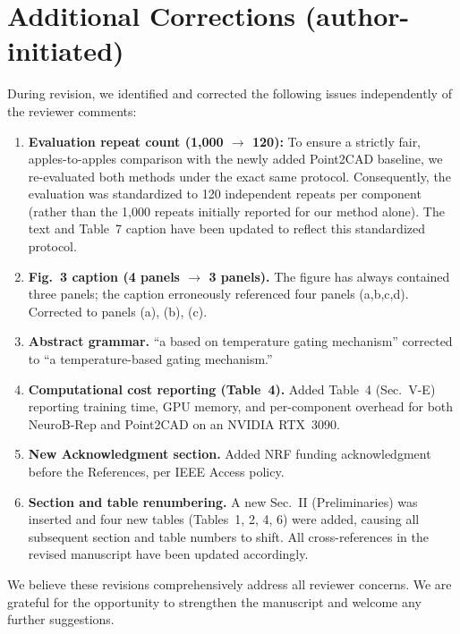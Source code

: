 \documentclass[11pt]{article}
\begin{document}
\section*{Additional Corrections (author-initiated)}

During revision, we identified and corrected the following issues
independently of the reviewer comments:

\begin{enumerate}[leftmargin=*, label=\textbf{\arabic*.}]
  \item \textbf{Evaluation repeat count (1{,}000 $\rightarrow$ 120):}
        To ensure a strictly fair, apples-to-apples comparison with the 
        newly added Point2CAD baseline, we re-evaluated both methods under 
        the exact same protocol. Consequently, the evaluation was standardized 
        to 120 independent repeats per component (rather than the 1,000 repeats 
        initially reported for our method alone). The text and Table~7 caption 
        have been updated to reflect this standardized protocol.

  \item \textbf{Fig.~3 caption (4 panels $\rightarrow$ 3 panels).}
        The figure has always contained three panels; the caption
        erroneously referenced four panels (a,b,c,d).
        Corrected to panels (a), (b), (c).

  \item \textbf{Abstract grammar.}
        ``a based on temperature gating mechanism'' corrected to
        ``a temperature-based gating mechanism.''

  \item \textbf{Computational cost reporting (Table~4).}
        Added Table~4 (Sec.~V-E) reporting training time, GPU memory,
        and per-component overhead for both NeuroB-Rep and Point2CAD
        on an NVIDIA RTX~3090.

  \item \textbf{New Acknowledgment section.}
        Added NRF funding acknowledgment before the References,
        per IEEE Access policy.

  \item \textbf{Section and table renumbering.}
        A new Sec.~II (Preliminaries) was inserted and four new tables
        (Tables~1, 2, 4, 6) were added, causing all subsequent section
        and table numbers to shift.
        All cross-references in the revised manuscript have been updated
        accordingly.
\end{enumerate}

\bigskip
\noindent We believe these revisions comprehensively address all reviewer
concerns. We are grateful for the opportunity to strengthen the manuscript
and welcome any further suggestions.
\end{document}
